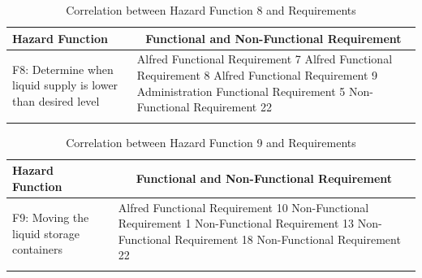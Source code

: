 \documentclass [10pt]{article}
\begin{document}

\begin{longtable}{| p{ } | p{ } |}
\hline 
\centering \textbf{Hazard Function} & 
\multicolumn{1}{c}{\textbf {Functional and Non-Functional Requirement}}\\ \hline
\multirow{4}{*}{F8: Determine when liquid supply is lower than desired level} & 
		{Alfred Functional Requirement 7 \newline
		Alfred Functional Requirement 8 \newline
		Alfred Functional Requirement 9 \newline
		Administration Functional Requirement 5 \newline
		Non-Functional Requirement 22} \\ 
\hline 
\caption{Correlation between Hazard Function 8 and Requirements}  
\end{longtable}


\pagebreak


\begin{longtable}{| p{ } | p{ } |}
\hline 
\centering \textbf{Hazard Function} & 
\multicolumn{1}{c}{\textbf {Functional and Non-Functional Requirement}}\\ \hline
\multirow{4}{*}{F9: Moving the liquid storage containers} & 
		{Alfred Functional Requirement 10 \newline
		Non-Functional Requirement 1 \newline
		Non-Functional Requirement 13 \newline
		Non-Functional Requirement 18 \newline
		Non-Functional Requirement 22} \\ 
\hline 
\caption{Correlation between Hazard Function 9 and Requirements}  
\end{longtable}

\end{document}

